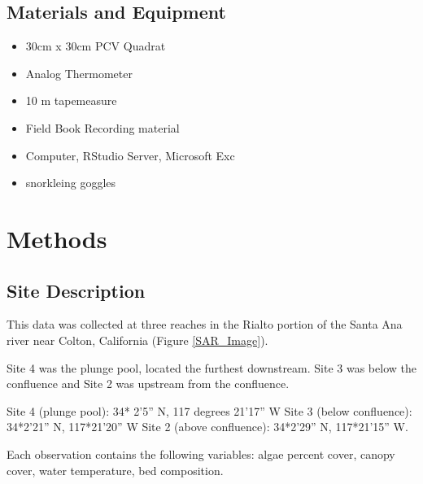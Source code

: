 \documentclass{article}
\begin{document}
\subsection{Materials and Equipment} 

\begin{itemize}

\item 30cm x 30cm PCV Quadrat
\item Analog Thermometer
\item 10 m tapemeasure
\item Field Book Recording material
\item Computer, RStudio Server, Microsoft Exc
\item snorkleing goggles 

\end{itemize}

\section{Methods}


\subsection{Site Description}

This data was collected at three reaches in the Rialto portion of the Santa Ana river near Colton, California (Figure \ref{SAR_Image}).

Site 4 was the plunge pool, located the furthest downstream. Site 3 was below the confluence and Site 2 was upstream from the confluence. 


Site 4 (plunge pool): 34* 2’5” N, 117 degrees 21’17” W 
Site 3 (below conﬂuence): 34*2’21” N, 117*21’20” W 
Site 2 (above conﬂuence): 34*2’29” N, 117*21’15” W. 

Each observation contains the following variables: algae percent cover, canopy cover, water temperature, bed composition.  
\end{document}

